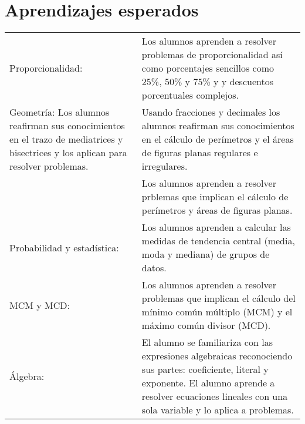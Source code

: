 \documentclass[letterpaper,10pt]{article}
\begin{document}
\newpage

\section{Aprendizajes esperados}
\begin{tabular}[t]{R{0.25\textwidth}p{0.71\textwidth}}
Proporcionalidad: 
                & Los alumnos aprenden a resolver problemas de
                proporcionalidad as\'i como porcentajes sencillos como 25\%, 50\%
                y 75\% y y descuentos porcentuales complejos. \\
Geometr\'ia:     
                Los alumnos reafirman sus conocimientos en el trazo de mediatrices
                y bisectrices y los aplican para resolver problemas.
                & Usando fracciones y decimales los alumnos reafirman sus
                conocimientos en el c\'alculo de  
                per\'imetros y el \'areas de figuras planas regulares e 
                irregulares. \\
                & Los alumnos aprenden a resolver prblemas que implican el
                c\'alculo de per\'imetros y \'areas de figuras planas. \\
Probabilidad y estad\'istica:
                & Los alumnos aprenden a calcular las medidas de tendencia 
                central (media, moda y mediana) de grupos de datos. \\
MCM y MCD: &    Los alumnos aprenden a resolver problemas que implican el 
                c\'alculo del m\'inimo com\'un m\'ultiplo (MCM) y el m\'aximo 
                com\'un divisor (MCD). \\
\'Algebra: &    El alumno se familiariza con las expresiones 
                algebraicas reconociendo sus partes: coeficiente, literal y
                exponente. El alumno aprende a resolver ecuaciones lineales con
                una sola variable y lo aplica a problemas.
\end{tabular}
\end{document}
